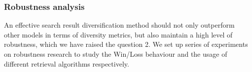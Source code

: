 \documentclass[review]{elsarticle}
\begin{document}


\subsubsection{Robustness analysis}\label{robut_anly}
An effective search result diversification method should not only outperform other models in terms of diversity metrics, but also maintain a high level of robustness, which we have raised the question 2.
We set up series of experiments on robustness research to study the Win/Loss behaviour and the usage of different retrieval algorithms respectively.

\end{document}
